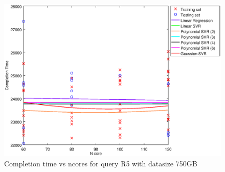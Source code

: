 
\begin {figure}[hbtp]
\centering
\includegraphics[width=\textwidth]{output/R5_750_LINEAR_NCORE/plot_R5_750.eps}
\caption{Completion time vs ncores for query R5 with datasize 750GB}
\label{fig:coreonly_linear_R5_750}
\end {figure}
